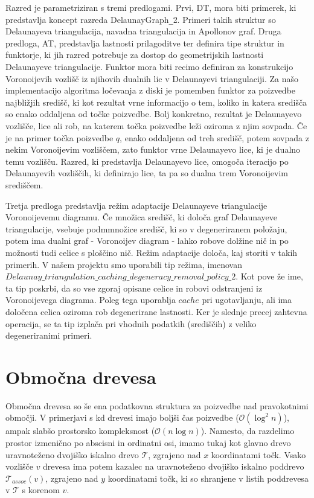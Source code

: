 \documentclass[a4paper, 12pt]{book}
\newcommand{\T}{\ensuremath{\mathcal{T}}}
\newcommand{\OO}{\ensuremath{\mathcal{O}}} %
\begin{document}
Razred je parametriziran s tremi predlogami. Prvi, DT, mora biti primerek, ki predstavlja koncept razreda DelaunayGraph\texttt{\_}2. Primeri takih struktur so Delaunayeva triangulacija, navadna triangulacija in Apollonov graf. Druga predloga, AT, predstavlja lastnosti prilagoditve ter definira tipe struktur in funktorje, ki jih razred potrebuje za dostop do geometrijskih lastnosti Delaunayeve triangulacije. Funktor mora biti recimo definiran za konstrukcijo Voronoijevih vozlišč iz njihovih dualnih lic v Delaunayevi triangulaciji. Za našo implementacijo algoritma ločevanja z diski je pomemben funktor za poizvedbe najbližjih središč, ki kot rezultat vrne informacijo o tem, koliko in katera središča so enako oddaljena od točke poizvedbe. Bolj konkretno, rezultat je Delaunayevo vozlišče, lice ali rob, na katerem točka poizvedbe leži oziroma z njim sovpada. Če je na primer točka poizvedbe $q$, enako oddaljena od treh središč, potem sovpada z nekim Voronoijevim vozliščem, zato funktor vrne Delaunayevo lice, ki je dualno temu vozlišču. Razred, ki predstavlja Delaunayevo lice, omogoča iteracijo po Delaunayevih vozliščih, ki definirajo lice, ta pa so dualna trem Voronoijevim središčem.

Tretja predloga predstavlja režim adaptacije Delaunayeve triangulacije Voronoijevemu diagramu. 
Če množica središč, ki določa graf Delaunayeve triangulacije, vsebuje podmmnožice središč, ki so v degeneriranem položaju, potem ima dualni graf - Voronoijev diagram - lahko robove dolžine nič in po možnosti tudi celice s ploščino nič. Režim adaptacije določa, kaj storiti v takih primerih. V našem projektu smo uporabili tip režima, imenovan $Delaunay\texttt{\_}triangulation\texttt{\_}caching\texttt{\_}degeneracy\texttt{\_}removal\texttt{\_}policy\texttt{\_}2$. Kot pove že ime, ta tip poskrbi, da so vse zgoraj opisane celice in robovi odstranjeni iz Voronoijevega diagrama. Poleg tega uporablja $cache$ pri ugotavljanju, ali ima določena celica oziroma rob degenerirane lastnosti. Ker je slednje precej zahtevna operacija, se ta tip izplača pri vhodnih podatkih (središčih) z veliko degeneriranimi primeri.
 

\section{Območna drevesa}
Območna drevesa so še ena podatkovna struktura za poizvedbe nad pravokotnimi območji. V primerjavi s kd drevesi imajo boljši čas poizvedbe ($\OO(\log^2 n)$), ampak slabšo prostorsko kompleksnost ($\OO(n\log n)$). Namesto, da razdelimo prostor izmenično po abscisni in ordinatni osi, imamo tukaj kot glavno drevo uravnoteženo dvojiško iskalno drevo $\T$, zgrajeno nad $x$ koordinatami točk. Vsako vozlišče $v$ drevesa ima potem kazalec na uravnoteženo dvojiško iskalno poddrevo $\T_{assoc}(v)$, zgrajeno nad $y$ koordinatami točk, ki so shranjene v listih poddrevesa v $\T$ s korenom $v$.
\end{document}
